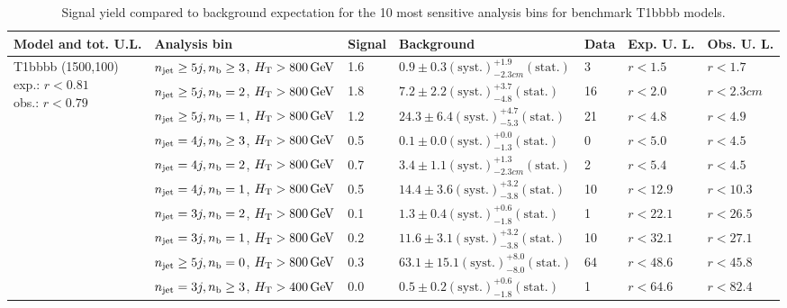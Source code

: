 \begin{table}[h!] 
  \scriptsize
  \caption{ 
Signal yield compared to background expectation for the 10 most sensitive analysis bins 
for benchmark T1bbbb models.
  \label{tab:sigBenchmarksYields_T1bbbb}}
  \centering 
  \begin{tabular}{ lllllll } 
    \hline 
    \hline 
    Model and tot. U.L. & Analysis bin & Signal & Background & Data & Exp. U. L. & Obs. U. L. \\ \hline
\multirow{10}{*}{\parbox[t]{2.3cm}{T1bbbb (1500,100)\\exp.: $r<0.81$\\obs.: $r<0.79$}}
 & $n_{\mathrm{jet}} \geq5j,n_{\text{b}} \geq3$, $\mbox{$H_\text{T}$} > 800 \, \mathrm{GeV}$ & 1.6 & $0.9 \pm 0.3 \mathrm{(syst.)} ^{+1.9}_{-2.3cm} \mathrm{(stat.)}$ & 3 & $r < 1.5$ & $r < 1.7$\\ 
 & $n_{\mathrm{jet}} \geq5j,n_{\text{b}} =2$, $\mbox{$H_\text{T}$} > 800 \, \mathrm{GeV}$ & 1.8 & $7.2 \pm 2.2 \mathrm{(syst.)} ^{+3.7}_{-4.8} \mathrm{(stat.)}$ & 16 & $r < 2.0$ & $r < 2.3cm$\\ 
 & $n_{\mathrm{jet}} \geq5j,n_{\text{b}} =1$, $\mbox{$H_\text{T}$} > 800 \, \mathrm{GeV}$ & 1.2 & $24.3 \pm 6.4 \mathrm{(syst.)} ^{+4.7}_{-5.3} \mathrm{(stat.)}$ & 21 & $r < 4.8$ & $r < 4.9$\\ 
 & $n_{\mathrm{jet}} =4j,n_{\text{b}} \geq3$, $\mbox{$H_\text{T}$} > 800 \, \mathrm{GeV}$ & 0.5 & $0.1 \pm 0.0 \mathrm{(syst.)} ^{+0.0}_{-1.3} \mathrm{(stat.)}$ & 0 & $r < 5.0$ & $r < 4.5$\\ 
 & $n_{\mathrm{jet}} =4j,n_{\text{b}} =2$, $\mbox{$H_\text{T}$} > 800 \, \mathrm{GeV}$ & 0.7 & $3.4 \pm 1.1 \mathrm{(syst.)} ^{+1.3}_{-2.3cm} \mathrm{(stat.)}$ & 2 & $r < 5.4$ & $r < 4.5$\\ 
 & $n_{\mathrm{jet}} =4j,n_{\text{b}} =1$, $\mbox{$H_\text{T}$} > 800 \, \mathrm{GeV}$ & 0.5 & $14.4 \pm 3.6 \mathrm{(syst.)} ^{+3.2}_{-3.8} \mathrm{(stat.)}$ & 10 & $r < 12.9$ & $r < 10.3$\\ 
 & $n_{\mathrm{jet}} =3j,n_{\text{b}} =2$, $\mbox{$H_\text{T}$} > 800 \, \mathrm{GeV}$ & 0.1 & $1.3 \pm 0.4 \mathrm{(syst.)} ^{+0.6}_{-1.8} \mathrm{(stat.)}$ & 1 & $r < 22.1$ & $r < 26.5$\\ 
 & $n_{\mathrm{jet}} =3j,n_{\text{b}} =1$, $\mbox{$H_\text{T}$} > 800 \, \mathrm{GeV}$ & 0.2 & $11.6 \pm 3.1 \mathrm{(syst.)} ^{+3.2}_{-3.8} \mathrm{(stat.)}$ & 10 & $r < 32.1$ & $r < 27.1$\\ 
 & $n_{\mathrm{jet}} \geq5j,n_{\text{b}} =0$, $\mbox{$H_\text{T}$} > 800 \, \mathrm{GeV}$ & 0.3 & $63.1 \pm 15.1 \mathrm{(syst.)} ^{+8.0}_{-8.0} \mathrm{(stat.)}$ & 64 & $r < 48.6$ & $r < 45.8$\\ 
 & $n_{\mathrm{jet}} =3j,n_{\text{b}} \geq3$, $\mbox{$H_\text{T}$} > 400 \, \mathrm{GeV}$ & 0.0 & $0.5 \pm 0.2 \mathrm{(syst.)} ^{+0.6}_{-1.8} \mathrm{(stat.)}$ & 1 & $r < 64.6$ & $r < 82.4$\\ \hline

\end{tabular}
\end{table}
